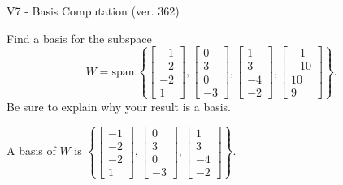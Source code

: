 \begin{exercise}
  \begin{exerciseTitle}V7 - Basis Computation (ver. 362)\end{exerciseTitle}
  \begin{exerciseStatement}
    Find a basis for the subspace 
\[W=\mathrm{span}\ \left\{\left[\begin{array}{r}
-1 \\
-2 \\
-2 \\
1
\end{array}\right] , \left[\begin{array}{r}
0 \\
3 \\
0 \\
-3
\end{array}\right] , \left[\begin{array}{r}
1 \\
3 \\
-4 \\
-2
\end{array}\right] , \left[\begin{array}{r}
-1 \\
-10 \\
10 \\
9
\end{array}\right]\right\}.\]
 Be sure to explain why your result is a basis.


  \end{exerciseStatement}
  \begin{exerciseAnswer}
   A basis of \(W\) is  \(\left\{\left[\begin{array}{r}
-1 \\
-2 \\
-2 \\
1
\end{array}\right] , \left[\begin{array}{r}
0 \\
3 \\
0 \\
-3
\end{array}\right] , \left[\begin{array}{r}
1 \\
3 \\
-4 \\
-2
\end{array}\right]\right\}\).
  


  \end{exerciseAnswer}
\end{exercise}